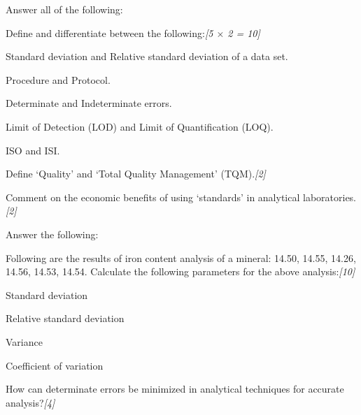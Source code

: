 \documentclass[11pt,a4paper]{article}
\newcommand{\pts}[1]{\hfill   \textit{[#1]}}
\begin{document}
\begin{enumerate}[label=   \textbf{\arabic*.}]

    \item Answer all of the following:
    
\begin{parts}
        \item Define and differentiate between the following:\pts{5 $ \times$ 2 = 10}
        
\begin{parts}
            \item Standard deviation and Relative standard deviation of a data set.
            \item Procedure and Protocol.
            \item Determinate and Indeterminate errors.
            \item Limit of Detection (LOD) and Limit of Quantification (LOQ).
            \item ISO and ISI.
        \end{parts}
        \item Define `Quality' and `Total Quality Management' (TQM).\pts{2}
        \item Comment on the economic benefits of using `standards' in analytical laboratories.\pts{2}
    \end{parts}

    \bigskip

    \item Answer the following:
    
\begin{parts}
        \item Following are the results of iron content analysis of a mineral: 14.50, 14.55, 14.26, 14.56, 14.53, 14.54. Calculate the following parameters for the above analysis:\pts{10}
        
\begin{parts}
            \item Standard deviation
            \item Relative standard deviation
            \item Variance
            \item Coefficient of variation
        \end{parts}
        \item How can determinate errors be minimized in analytical techniques for accurate analysis?\pts{4}
    \end{parts}


\end{enumerate}
\end{document}
